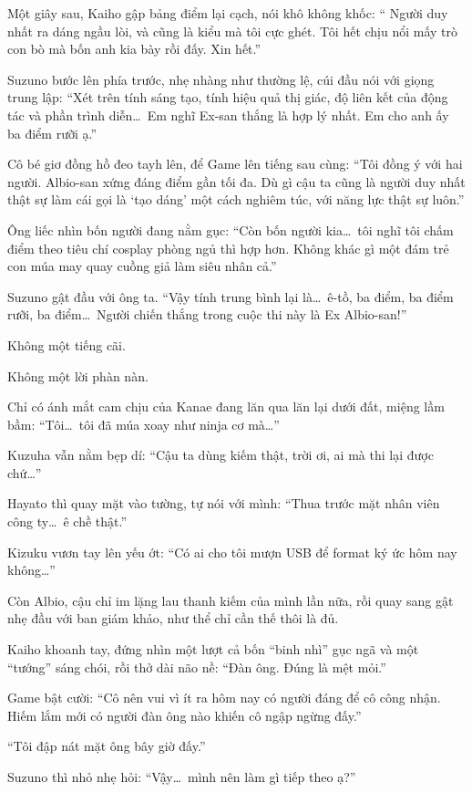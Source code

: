\documentclass[../main.tex]{subfiles}
\begin{document}
Một giây sau, Kaiho gập bảng điểm lại cạch, nói khô không khốc: `` Người duy nhất ra dáng ngầu lòi, và cũng là kiểu mà tôi cực ghét. Tôi hết chịu nổi mấy trò con bò mà bốn anh kia bày rồi đấy. Xin hết.''

Suzuno bước lên phía trước, nhẹ nhàng như thường lệ, cúi đầu nói với giọng trung lập: ``Xét trên tính sáng tạo, tính hiệu quả thị giác, độ liên kết của động tác và phần trình diễn\dots\ Em nghĩ Ex-san thắng là hợp lý nhất. Em cho anh ấy ba điểm rưỡi ạ.''

Cô bé giơ đồng hồ đeo tayh lên, để Game lên tiếng sau cùng: ``Tôi đồng ý với hai người. Albio-san xứng đáng điểm gần tối đa. Dù gì cậu ta cũng là người duy nhất thật sự làm cái gọi là `tạo dáng' một cách nghiêm túc, với năng lực thật sự luôn.''

Ông liếc nhìn bốn người đang nằm gục: ``Còn bốn người kia\dots\ tôi nghĩ tôi chấm điểm theo tiêu chí cosplay phòng ngủ thì hợp hơn. Không khác gì một đám trẻ con múa may quay cuồng giả làm siêu nhân cả.''

Suzuno gật đầu với ông ta. ``Vậy tính trung bình lại là\dots\ ê-tồ, ba điểm, ba điểm rưỡi, ba điểm\dots\ Người chiến thắng trong cuộc thi này là Ex Albio-san!''

Không một tiếng cãi.

Không một lời phàn nàn.

Chỉ có ánh mắt cam chịu của Kanae đang lăn qua lăn lại dưới đất, miệng lầm bầm: ``Tôi\dots\ tôi đã múa xoay như ninja cơ mà\dots''

Kuzuha vẫn nằm bẹp dí: ``Cậu ta dùng kiếm thật, trời ơi, ai mà thi lại được chứ\dots''

Hayato thì quay mặt vào tường, tự nói với mình: ``Thua trước mặt nhân viên công ty\dots\ ê chề thật.''

Kizuku vươn tay lên yếu ớt: ``Có ai cho tôi mượn USB để format ký ức hôm nay không\dots''

Còn Albio, cậu chỉ im lặng lau thanh kiếm của mình lần nữa, rồi quay sang gật nhẹ đầu với ban giám khảo, như thể chỉ cần thế thôi là đủ.

Kaiho khoanh tay, đứng nhìn một lượt cả bốn ``binh nhì'' gục ngã và một ``tướng'' sáng chói, rồi thở dài não nề: ``Đàn ông. Đúng là mệt mỏi.''

Game bật cười: ``Cô nên vui vì ít ra hôm nay có người đáng để cô công nhận. Hiếm lắm mới có người đàn ông nào khiến cô ngập ngừng đấy.''

``Tôi đập nát mặt ông bây giờ đấy.''

Suzuno thì nhỏ nhẹ hỏi: ``Vậy\dots\ mình nên làm gì tiếp theo ạ?''
\omk
\end{document}
